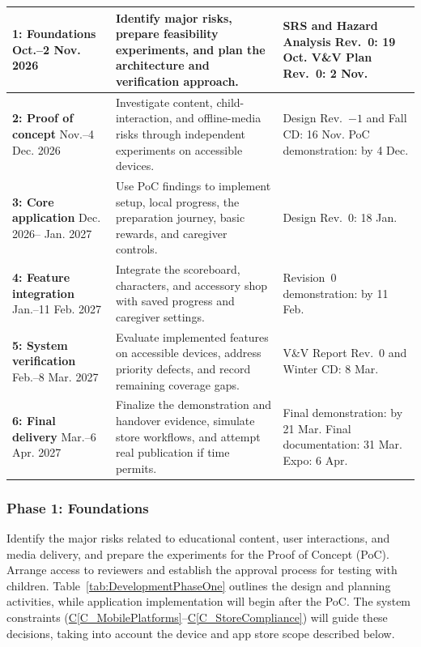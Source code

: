 \documentclass[10pt]{article}
\newcommand{\conref}[1]{\hyperref[#1]{C\ref*{#1}}}
\begin{document}
\begin{longtable}{@{}>{\raggedright\arraybackslash}p{}
>{\raggedright\arraybackslash}p{}
>{\raggedright\arraybackslash}p{}@{}}
\textbf{1: Foundations}\newline
19 Oct.--2 Nov. 2026 &
Identify major risks, prepare feasibility experiments, and plan the
architecture and verification approach. &
SRS and Hazard Analysis Rev.~0: 19 Oct.\newline
V\&V Plan Rev.~0: 2 Nov. \\
\midrule
\textbf{2: Proof of concept}\newline
3 Nov.--4 Dec. 2026 &
Investigate content, child-interaction, and offline-media risks through
independent experiments on accessible devices. &
Design Rev.~$-1$ and Fall CD: 16 Nov.\newline
PoC demonstration: by 4 Dec. \\
\midrule
\textbf{3: Core application}\newline
5 Dec. 2026--\newline 18 Jan. 2027 &
Use PoC findings to implement setup, local progress, the preparation journey,
basic rewards, and caregiver controls. &
Design Rev.~0: 18 Jan. \\
\midrule
\textbf{4: Feature integration}\newline
19 Jan.--11 Feb. 2027 &
Integrate the scoreboard, characters, and accessory shop with saved progress
and caregiver settings. &
Revision~0 demonstration: by 11 Feb. \\
\midrule
\textbf{5: System verification}\newline
12 Feb.--8 Mar. 2027 &
Evaluate implemented features on accessible devices, address priority
defects, and record remaining coverage gaps. &
V\&V Report Rev.~0 and Winter CD: 8 Mar. \\
\midrule
\textbf{6: Final delivery}\newline
9 Mar.--6 Apr. 2027 &
Finalize the demonstration and handover evidence, simulate store workflows,
and attempt real publication if time permits. &
Final demonstration: by 21 Mar.\newline
Final documentation: 31 Mar.\newline
Expo: 6 Apr. \\
\end{longtable}
\endgroup

\subsubsection*{Phase 1: Foundations}

Identify the major risks related to educational content,
user interactions, and media delivery, and prepare the
experiments for the Proof of Concept (PoC). Arrange access
to reviewers and establish the approval process for testing
with children. Table~\ref{tab:DevelopmentPhaseOne} outlines the design
and planning activities, while application implementation
will begin after the PoC. The system constraints
(\conref{C_MobilePlatforms}--\conref{C_StoreCompliance})
will guide these decisions, taking into account the
device and app store scope described below.
\end{document}
